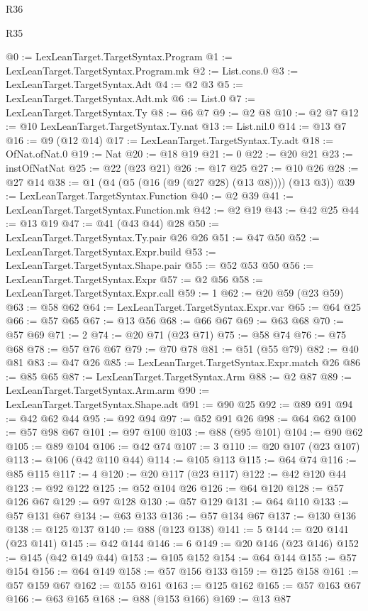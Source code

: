 \begin{lexlean}{R36}
\begin{lexlean}{R35}
\begin{coremodule}
{{{{{{{{{{{{{@0 := LexLeanTarget.TargetSyntax.Program
@1 := LexLeanTarget.TargetSyntax.Program.mk
@2 := List.cons.{0}
@3 := LexLeanTarget.TargetSyntax.Adt
@4 := @2 @3
@5 := LexLeanTarget.TargetSyntax.Adt.mk
@6 := List.{0}
@7 := LexLeanTarget.TargetSyntax.Ty
@8 := @6 @7
@9 := @2 @8
@10 := @2 @7
@12 := @10 LexLeanTarget.TargetSyntax.Ty.nat
@13 := List.nil.{0}
@14 := @13 @7
@16 := @9 (@12 @14)
@17 := LexLeanTarget.TargetSyntax.Ty.adt
@18 := OfNat.ofNat.{0}
@19 := Nat
@20 := @18 @19
@21 := 0
@22 := @20 @21
@23 := instOfNatNat
@25 := @22 (@23 @21)
@26 := @17 @25
@27 := @10 @26
@28 := @27 @14
@38 := @1 (@4 (@5 (@16 (@9 (@27 @28) (@13 @8)))) (@13 @3))
@39 := LexLeanTarget.TargetSyntax.Function
@40 := @2 @39
@41 := LexLeanTarget.TargetSyntax.Function.mk
@42 := @2 @19
@43 := @42 @25
@44 := @13 @19
@47 := @41 (@43 @44) @28
@50 := LexLeanTarget.TargetSyntax.Ty.pair @26 @26
@51 := @47 @50
@52 := LexLeanTarget.TargetSyntax.Expr.build
@53 := LexLeanTarget.TargetSyntax.Shape.pair
@55 := @52 @53 @50
@56 := LexLeanTarget.TargetSyntax.Expr
@57 := @2 @56
@58 := LexLeanTarget.TargetSyntax.Expr.call
@59 := 1
@62 := @20 @59 (@23 @59)
@63 := @58 @62
@64 := LexLeanTarget.TargetSyntax.Expr.var
@65 := @64 @25
@66 := @57 @65
@67 := @13 @56
@68 := @66 @67
@69 := @63 @68
@70 := @57 @69
@71 := 2
@74 := @20 @71 (@23 @71)
@75 := @58 @74
@76 := @75 @68
@78 := @57 @76 @67
@79 := @70 @78
@81 := @51 (@55 @79)
@82 := @40 @81
@83 := @47 @26
@85 := LexLeanTarget.TargetSyntax.Expr.match @26
@86 := @85 @65
@87 := LexLeanTarget.TargetSyntax.Arm
@88 := @2 @87
@89 := LexLeanTarget.TargetSyntax.Arm.arm
@90 := LexLeanTarget.TargetSyntax.Shape.adt
@91 := @90 @25
@92 := @89 @91
@94 := @42 @62 @44
@95 := @92 @94
@97 := @52 @91 @26
@98 := @64 @62
@100 := @57 @98 @67
@101 := @97 @100
@103 := @88 (@95 @101)
@104 := @90 @62
@105 := @89 @104
@106 := @42 @74
@107 := 3
@110 := @20 @107 (@23 @107)
@113 := @106 (@42 @110 @44)
@114 := @105 @113
@115 := @64 @74
@116 := @85 @115
@117 := 4
@120 := @20 @117 (@23 @117)
@122 := @42 @120 @44
@123 := @92 @122
@125 := @52 @104 @26
@126 := @64 @120
@128 := @57 @126 @67
@129 := @97 @128
@130 := @57 @129
@131 := @64 @110
@133 := @57 @131 @67
@134 := @63 @133
@136 := @57 @134 @67
@137 := @130 @136
@138 := @125 @137
@140 := @88 (@123 @138)
@141 := 5
@144 := @20 @141 (@23 @141)
@145 := @42 @144
@146 := 6
@149 := @20 @146 (@23 @146)
@152 := @145 (@42 @149 @44)
@153 := @105 @152
@154 := @64 @144
@155 := @57 @154
@156 := @64 @149
@158 := @57 @156 @133
@159 := @125 @158
@161 := @57 @159 @67
@162 := @155 @161
@163 := @125 @162
@165 := @57 @163 @67
@166 := @63 @165
@168 := @88 (@153 @166)
@169 := @13 @87
}}}}}}}}}}}}}
\end{coremodule}
\end{lexlean}
\end{lexlean}
